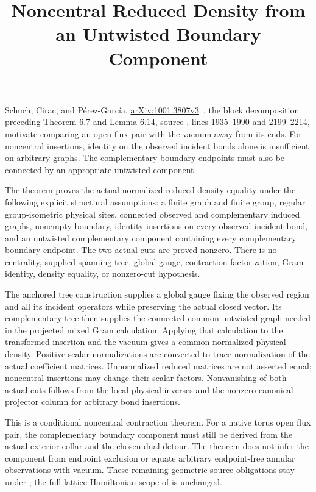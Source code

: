 \documentclass{article}
\title{Noncentral Reduced Density from an Untwisted Boundary Component}
\author{}
\date{}
\begin{document}
\maketitle
{}

Schuch, Cirac, and P\'erez-Garc\'ia,
\href{https://arxiv.org/abs/1001.3807v3}{arXiv:1001.3807v3}~\cite{Schuch2010PEPS},
the block decomposition preceding Theorem 6.7 and Lemma 6.14, source
, lines 1935--1990 and 2199--2214,
motivate comparing an open flux pair with the vacuum away from its ends.
For noncentral insertions, identity on the observed incident bonds alone
is insufficient on arbitrary graphs. The complementary boundary endpoints
must also be connected by an appropriate untwisted component.

The theorem
proves the actual normalized reduced-density equality under the following
explicit structural assumptions: a finite graph and finite group, regular
group-isometric physical sites, connected observed and complementary
induced graphs, nonempty boundary, identity insertions on every observed
incident bond, and an untwisted complementary component containing every
complementary boundary endpoint. The two actual cuts are proved nonzero.
There is no centrality, supplied spanning tree, global gauge, contraction
factorization, Gram identity, density equality, or nonzero-cut hypothesis.

The anchored tree construction supplies a global gauge fixing the observed
region and all its incident operators while preserving the actual closed
vector. Its complementary tree then supplies the connected common
untwisted graph needed in the projected mixed Gram calculation. Applying
that calculation to the transformed insertion and the vacuum gives a common
normalized physical density. Positive scalar normalizations are converted
to trace normalization of the actual coefficient matrices. Unnormalized
reduced matrices are not asserted equal; noncentral insertions may change
their scalar factors.
Nonvanishing of both actual cuts follows from the local physical inverses
and the nonzero canonical projector column for arbitrary bond insertions.

This is a conditional noncentral contraction theorem. For a native torus
open flux pair, the complementary boundary component must still be derived
from the actual exterior collar and the chosen dual detour. The theorem
does not infer the component from
endpoint exclusion or equate arbitrary endpoint-free annular observations
with vacuum. These remaining geometric source obligations stay under
; the full-lattice Hamiltonian scope of  is
unchanged.


\end{document}
